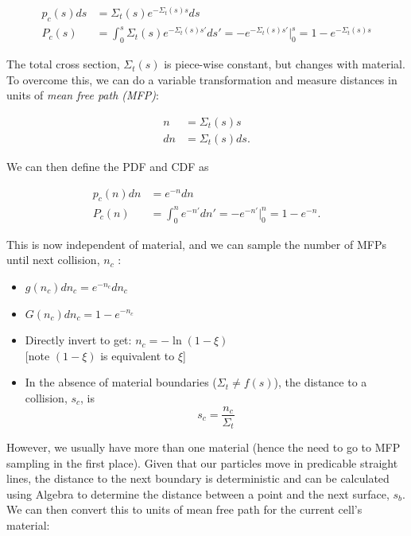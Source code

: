 \documentclass[12pt]{article}
\begin{document}
\begin{align*}
    p_c(s)ds &= \Sigma_t(s) e^{-\Sigma_t(s) s} ds \\
    P_c(s) &= \int_0^s \Sigma_t(s) e^{-\Sigma_t(s) s'}ds' = -e^{-\Sigma_t(s) s'} |_0^s = 1 - e^{-\Sigma_t(s) s}
\end{align*}

The total cross section, $\Sigma_t(s)$ is piece-wise constant, but changes with material.
To overcome this, we can do a variable transformation and measure distances in units of \textit{mean free path (MFP)}:

\begin{align*}
    n &= \Sigma_t(s)s \\
    dn &= \Sigma_t(s)ds.
\end{align*}

We can then define the PDF and CDF as 

 \begin{align*}
    p_c(n)dn &= e^{-n} dn\\
    P_c(n) &= \int_0^n e^{-n'}dn' = -e^{-n'} |_0^n = 1 - e^{-n}.
  \end{align*}

This is now independent of material, and we can sample the number of MFPs until next collision, $n_c$ :

\begin{itemize}
  \item $g(n_c) dn_c = e^{-n_c} dn_c$ 
  \vspace{.5em}
  \item $G(n_c) dn_c = 1 - e^{-n_c}$ 
  \vspace{.5em}
  \item Directly invert to get: $\boxed{n_c = - \ln(1 - \xi)}$ \\
   \hspace*{1.5em} [note $(1-\xi)$ is equivalent to $\xi$]
  \vspace{.5em}
  \item In the absence of material boundaries ($\Sigma_t \neq f(s)$), the distance to a collision, $s_c$, is
  \[s_c = \frac{n_c}{\Sigma_t}\]
\end{itemize}

However, we usually have more than one material (hence the need to go to MFP sampling in the first place).
Given that our particles move in predicable straight lines, the distance to the next boundary is deterministic and can be calculated using Algebra to determine the distance between a point and the next surface, $s_b$.  
We can then convert this to units of mean free path for the current cell's material:
\end{document}
